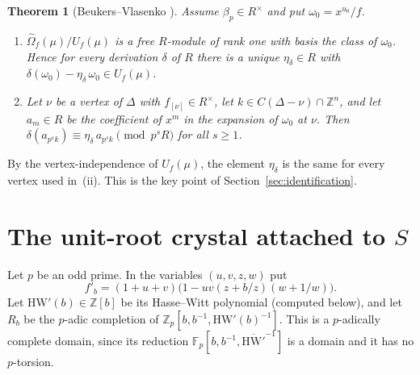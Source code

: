 \documentclass[11pt]{amsart}
\newtheorem{theorem}{Theorem}[section]
\theoremstyle{definition}
\theoremstyle{remark}
\newcommand{\Z}{\mathbb{Z}}
\newcommand{\F}{\mathbb{F}}
\newcommand{\Zp}{\mathbb{Z}_p}
\begin{document}
\begin{theorem}[{Beukers--Vlasenko \cite[Theorems 4.3 and 5.7]{BV1}}]\label{thm:BV}
Assume $\beta_p\in R^\times$ and put $\omega_0=x^{u_0}/f$.
\begin{enumerate}[label=(\roman*)]
\item $\widehat\Omega_f(\mu)/U_f(\mu)$ is a free $R$-module of rank one with basis the class of
$\omega_0$. Hence for every derivation $\delta$ of $R$ there is a unique $\eta_\delta\in R$ with
$\delta(\omega_0)-\eta_\delta\,\omega_0\in U_f(\mu)$.
\item Let $\nu$ be a vertex of $\Delta$ with $f_{[\nu]}\in R^\times$, let
$k\in C(\Delta-\nu)\cap\Z^n$, and let $a_m\in R$ be the coefficient of $x^m$ in the expansion of
$\omega_0$ at $\nu$. Then
$\delta(a_{p^sk})\equiv\eta_\delta\,a_{p^sk}\pmod{p^sR}$ for all $s\ge1$.
\end{enumerate}
\end{theorem}

By the vertex-independence of $U_f(\mu)$, the element $\eta_\delta$ is the same for every vertex
used in~(ii). This is the key point of Section~\ref{sec:identification}.

\section{The unit-root crystal attached to \texorpdfstring{$S$}{S}}\label{sec:crystal}

Let $p$ be an odd prime. In the variables $(u,v,z,w)$ put
\[
 f'_b=(1+u+v)\bigl(1-uv(z+b/z)(w+1/w)\bigr).
\]
Let $\mathrm{HW}'(b)\in\Z[b]$ be its Hasse--Witt polynomial (computed below), and let $R_b$ be the
$p$-adic completion of $\Zp[b,b^{-1},\mathrm{HW}'(b)^{-1}]$. This is a $p$-adically complete
domain, since its reduction $\F_p[b,b^{-1},\overline{\mathrm{HW}'}^{-1}]$ is a domain and it has no
$p$-torsion.
\end{document}
